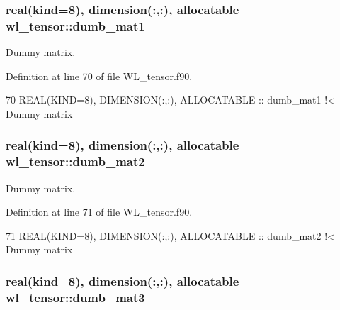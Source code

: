 \subsubsection[{\texorpdfstring{dumb\+\_\+mat1}{dumb_mat1}}]{\setlength{\rightskip}{0pt plus 5cm}real(kind=8), dimension(\+:,\+:), allocatable wl\+\_\+tensor\+::dumb\+\_\+mat1\hspace{0.3cm}{\ttfamily [private]}}\hypertarget{namespacewl__tensor_a47f8f8062b343d2c40334f71b7bd7874}{}\label{namespacewl__tensor_a47f8f8062b343d2c40334f71b7bd7874}


Dummy matrix. 



Definition at line 70 of file W\+L\+\_\+tensor.\+f90.


\begin{DoxyCode}
70   \textcolor{keywordtype}{REAL(KIND=8)}, \textcolor{keywordtype}{DIMENSION(:,:)}, \textcolor{keywordtype}{ALLOCATABLE} :: dumb\_mat1\textcolor{comment}{ !< Dummy matrix}
\end{DoxyCode}
\subsubsection[{\texorpdfstring{dumb\+\_\+mat2}{dumb_mat2}}]{\setlength{\rightskip}{0pt plus 5cm}real(kind=8), dimension(\+:,\+:), allocatable wl\+\_\+tensor\+::dumb\+\_\+mat2\hspace{0.3cm}{\ttfamily [private]}}\hypertarget{namespacewl__tensor_ae3b68a59db71378ea01f2cd20eb9f611}{}\label{namespacewl__tensor_ae3b68a59db71378ea01f2cd20eb9f611}


Dummy matrix. 



Definition at line 71 of file W\+L\+\_\+tensor.\+f90.


\begin{DoxyCode}
71   \textcolor{keywordtype}{REAL(KIND=8)}, \textcolor{keywordtype}{DIMENSION(:,:)}, \textcolor{keywordtype}{ALLOCATABLE} :: dumb\_mat2\textcolor{comment}{ !< Dummy matrix}
\end{DoxyCode}
\subsubsection[{\texorpdfstring{dumb\+\_\+mat3}{dumb_mat3}}]{\setlength{\rightskip}{0pt plus 5cm}real(kind=8), dimension(\+:,\+:), allocatable wl\+\_\+tensor\+::dumb\+\_\+mat3\hspace{0.3cm}{\ttfamily [private]}}\hypertarget{namespacewl__tensor_a489cd37af9ca5ee74e61c60c0e79830f}{}\label{namespacewl__tensor_a489cd37af9ca5ee74e61c60c0e79830f}


